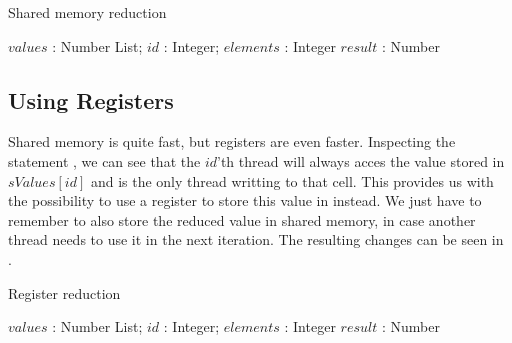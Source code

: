 \begin{algorithm}
  \caption{Shared memory reduction}
  \label{alg:sharedReduct}
  \begin{algorithmic}
              {$values$ : Number List; $id$ : Integer; $elements$ : Integer}
              {$result$ : Number}
              {
                \SYNC
                  \ENDIF
                  \SYNC
                \ENDWHILE
                \ENDIF
              }
  \end{algorithmic}
\end{algorithm}

\subsection{Using Registers}

Shared memory is quite fast, but registers are even faster. Inspecting
the statement , we can see
that the $id$'th thread will always acces the value stored in
$sValues[id]$ and is the only thread writting to that cell. This
provides us with the possibility to use a register to store this value
in instead. We just have to remember to also store the reduced value
in shared memory, in case another thread needs to use it in the next
iteration. The resulting changes can be seen in
.

\begin{algorithm}
  \caption{Register reduction}
  \label{alg:registerReduct}
  \begin{algorithmic}
              {$values$ : Number List; $id$ : Integer; $elements$ : Integer}
              {$result$ : Number}
              {
                \SYNC
                  \ENDIF
                  \SYNC
                \ENDWHILE
                \ENDIF
              }
  \end{algorithmic}
\end{algorithm}



